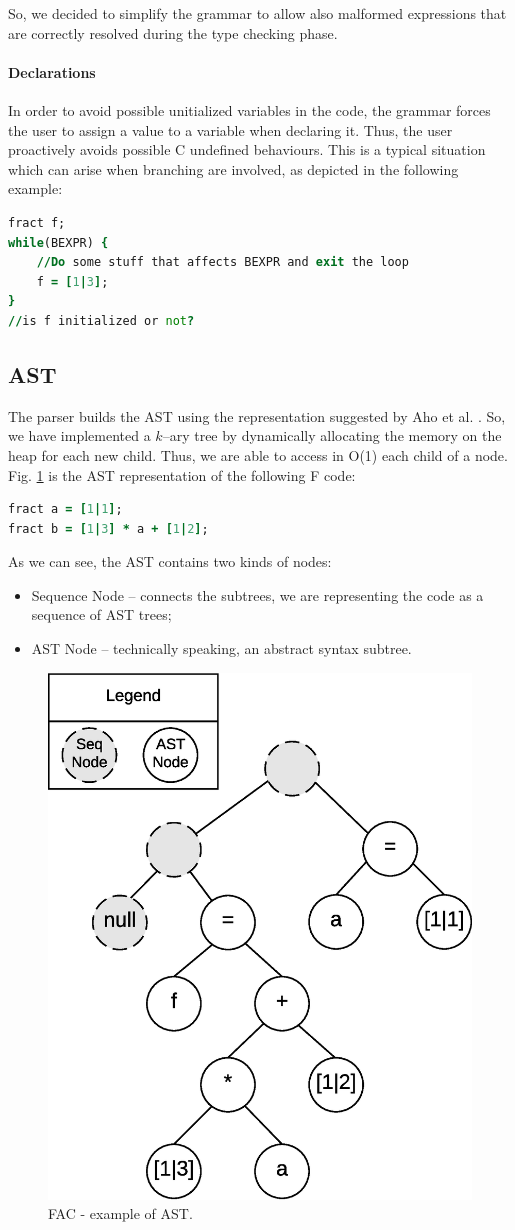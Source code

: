 So, we decided to simplify the grammar to allow also malformed expressions that
are correctly resolved during the type checking phase.


\paragraph{Declarations}

In order to avoid possible unitialized variables in the code, the grammar
forces the user to assign a value to a variable when declaring it.
Thus, the user proactively avoids possible C undefined behaviours.
This is a typical situation which can arise
when branching are involved, as depicted in the following example:
\begin{lstlisting}[language=F, caption={Example of possible uninitialized 
variable.},captionpos=b,label=f-code0, frame = single]
fract f;
while(BEXPR) {
    //Do some stuff that affects BEXPR and exit the loop
    f = [1|3];
}
//is f initialized or not?
\end{lstlisting}

\subsection{AST}
The parser builds the AST using the representation suggested by Aho et al. 
\cite{dragonbook}. So, we have implemented a $k$--ary
tree by dynamically allocating the memory on the heap for each new child. Thus, 
we are able to access in O(1) each child of a node.
Fig. \ref{fig:ast} is the AST representation of the following F code:
\begin{lstlisting}[language=F,caption={Example of F code},captionpos=b,
label=f-code1, frame=single]
fract a = [1|1];
fract b = [1|3] * a + [1|2];
\end{lstlisting}
As we can see, the AST contains two kinds of nodes:
\begin{itemize}
	\item Sequence Node -- connects the subtrees, we are representing the 
	code as a sequence of AST trees;
	\item AST Node -- technically speaking, an abstract syntax subtree.
\end{itemize}
\begin{figure}[H]
  \centering
  \includegraphics[width=.5\columnwidth]{img/eps/ast.eps}
  \caption{FAC - example of AST.}
  \label{fig:ast}
\end{figure}

